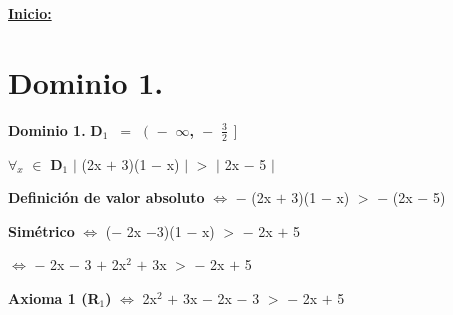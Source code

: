 \documentclass[12pt]{article}
\newenvironment{MyColorPar}[1]{%
    \leavevmode\color{#1}\ignorespaces%
}{%
}%
\begin{document}

{\bfseries{{\textcolor{Milano Red}{\underline{Inicio:}}}}} 

\section*{{\textcolor{Tarawera}{\textsf{Dominio 1.}}}}

\begin{MyColorPar}{Tarawera}
{\bfseries{Dominio 1.}}  {\bfseries{{\textcolor{Burnt Sienna}{\mbox{D$_{1}$ $=$ {$\Big($} $-$ $\infty$, $-$ {\Large{$\frac{3}{2}$}}} {$\Big ]\ $}}}}}
\end{MyColorPar} \vspace{0.5cm}

\hspace{4.5cm} $\forall$$_{x}$ $\in$  {\bfseries{{\textcolor{Burnt Sienna}{\mbox{D$_{1}$}}}}} \hspace{0.5cm} $\mid$ (2x $+$ 3)(1 $-$ x) $\mid$ $>$ $\mid$ 2x $-$ 5 $\mid$ \vspace{0.5cm}

{\bfseries{Definición de valor absoluto}} \hspace{0.1cm} $\Longleftrightarrow$ \hspace{0.2cm} $-$ (2x $+$ 3)(1 $-$ x) $>$ $-$ (2x $-$ 5) \vspace{0.5cm}

\hspace{3cm} {\bfseries{Simétrico}} \hspace{.5cm} $\Longleftrightarrow$ \hspace{0.2cm} ($-$ 2x $-$3)(1 $-$ x) $>$ $-$ 2x $+$ 5 \vspace{0.5cm}

\hspace{5.6cm} $\Longleftrightarrow$ \hspace{0.2cm} $-$ 2x $-$ 3 $+$ 2x$^{2}$ $+$ 3x $>$ $-$ 2x $+$ 5 \vspace{0.5cm}

\hspace{2cm} {\bfseries{{\textcolor{carrotorange}{Axioma 1 (R$_{1}$)}}}} \hspace{.5cm} $\Longleftrightarrow$ \hspace{0.2cm} 2x$^{2}$ $+$ 3x $-$ 2x $-$ 3  $>$ $-$ 2x $+$ 5 \vspace{0.5cm}
\end{document}
